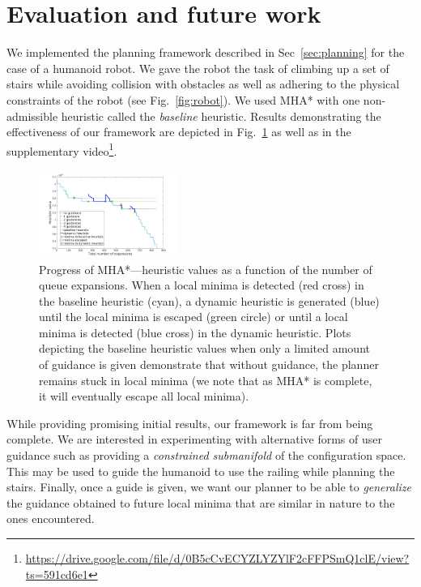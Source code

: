 \documentclass[conference]{IEEEtran}
\begin{document}
\section{Evaluation and future work}\label{sec:eval}
We implemented the planning framework described in Sec~\ref{sec:planning} for the case of a humanoid robot. We gave the robot the task of climbing up a set of stairs while avoiding collision with obstacles as well as adhering to the physical constraints of the robot (see Fig.~\ref{fig:robot}).
We used MHA* with one non-admissible heuristic called the \emph{baseline} heuristic.
Results demonstrating the effectiveness of our framework are depicted in Fig.~\ref{fig:res}
as well as in the supplementary video\footnote{
\url{https://drive.google.com/file/d/0B5cCvECYZLYZYlF2cFFPSmQ1clE/view?ts=591cd6e1}}. 


\begin{figure}[tb]
  \centering
  	\includegraphics[width=0.4\textwidth]{fig/heuristic_value.jpg}
  	\vspace{-2mm}
  \caption{
		Progress of MHA*---heuristic values as a function of the number of queue expansions.
		When a local minima is detected (red cross) in the baseline heuristic (cyan), a dynamic heuristic is generated (blue) until the local minima is escaped (green circle) or until a local minima is detected (blue cross) in the dynamic heuristic.
		Plots depicting the baseline heuristic values when only a limited amount of guidance is given demonstrate that without guidance, the planner remains stuck in local minima (we note that as MHA* is complete, it will eventually escape all local minima).
		}
\vspace{-5mm}
   	\label{fig:res}
\end{figure}

While providing promising initial results, our framework is far from being complete.
We are interested in experimenting with alternative forms of user guidance such as providing a \emph{constrained submanifold} of the configuration space. This may be used to guide the humanoid to use the railing while planning the stairs.
Finally, once a guide is given, we want our planner to be able to \emph{generalize} the guidance obtained to future local minima that are similar in nature to the ones encountered.


%


\end{document}
